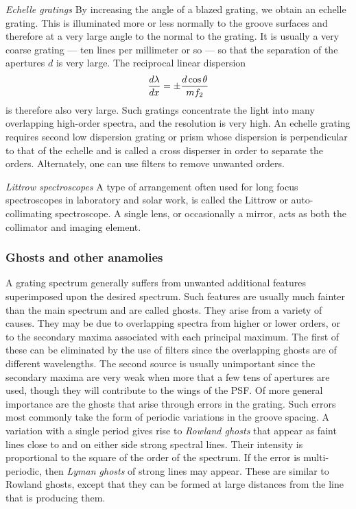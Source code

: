 \noindent
{\it Echelle gratings} By increasing the angle of a blazed grating, we obtain an echelle 
grating. This is illuminated more or less normally to the groove surfaces and therefore at
a very large angle to the normal to the grating. It is usually a very coarse grating ---
ten lines per millimeter or so --- so that the separation of the apertures $d$ is very large. The reciprocal linear dispersion
\[
{d\lambda\over dx}=\pm{d\cos\theta\over mf_2}
\]
is therefore also very large. Such gratings concentrate the light into many overlapping high-order spectra, and the resolution is very high. An echelle grating requires second
low dispersion grating or prism whose dispersion is perpendicular to that of the echelle
and is called a cross disperser in order to separate the orders. Alternately, one can use filters to remove unwanted orders.

\noindent
{\it Littrow spectroscopes} A type of arrangement often used for long focus spectroscopes in laboratory and solar work, is called the Littrow or auto-collimating spectroscope. A single lens, or occasionally a mirror, acts as both the collimator and imaging element.

\subsubsection{Ghosts and other anamolies}

A grating spectrum generally suffers from unwanted additional features superimposed upon the desired spectrum. Such features are usually much fainter than the main spectrum and are called ghosts. They arise from a variety of causes. They may be due
to overlapping spectra from higher or lower orders, or to the secondary maxima associated with each principal maximum. The first of these can be eliminated by the use
of filters since the overlapping ghosts are of different wavelengths. The second source
is usually unimportant since the secondary maxima are very weak when more that a few
tens of apertures are used, though they will contribute to the wings of the PSF. 
Of more general importance are the ghosts that arise through errors in the grating. 
Such errors most commonly take the form of periodic variations in the groove spacing.
A variation with a single period gives rise to {\it Rowland ghosts} that appear as faint
lines close to and on either side strong spectral lines. Their intensity is proportional to the square of the order of the spectrum. If the error is multi-periodic, then {\it Lyman ghosts} of strong lines may appear. These are similar to Rowland ghosts, except that they can be formed at large distances from the line that is producing them. 

